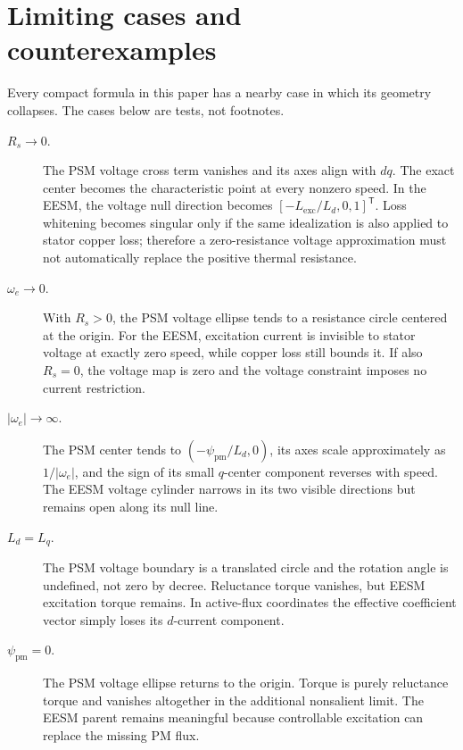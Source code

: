 \section{Limiting cases and counterexamples}
\label{sec:limits}

Every compact formula in this paper has a nearby case in which its geometry
collapses. The cases below are tests, not footnotes.

\begin{description}
 \item[\(R_s\to0\).] The PSM voltage cross term vanishes and its axes align
 with \(dq\). The exact center becomes the characteristic point at every
 nonzero speed. In the EESM, the voltage null direction becomes
 \([-L_{\mathrm{exc}}/L_d,0,1]^{\mathsf T}\). Loss whitening becomes singular
 only if the same idealization is also applied to stator copper loss; therefore
 a zero-resistance voltage approximation must not automatically replace the
 positive thermal resistance.

 \item[\(\omega_e\to0\).] With \(R_s>0\), the PSM voltage ellipse tends to a
 resistance circle centered at the origin. For the EESM, excitation current is
 invisible to stator voltage at exactly zero speed, while copper loss still
 bounds it. If also \(R_s=0\), the voltage map is zero and the voltage
 constraint imposes no current restriction.

 \item[\(|\omega_e|\to\infty\).] The PSM center tends to
 \((-\psi_{\mathrm{pm}}/L_d,0)\), its axes scale approximately as
 \(1/|\omega_e|\), and the sign of its small \(q\)-center component reverses
 with speed. The EESM voltage cylinder narrows in its two visible directions
 but remains open along its null line.

 \item[\(L_d=L_q\).] The PSM voltage boundary is a translated circle and the
 rotation angle is undefined, not zero by decree. Reluctance torque vanishes,
 but EESM excitation torque remains. In active-flux coordinates the effective
 coefficient vector simply loses its \(d\)-current component.

 \item[\(\psi_{\mathrm{pm}}=0\).] The PSM voltage ellipse returns to the origin.
 Torque is purely reluctance torque and vanishes altogether in the additional
 nonsalient limit. The EESM parent remains meaningful because controllable
 excitation can replace the missing PM flux.


\end{description}
